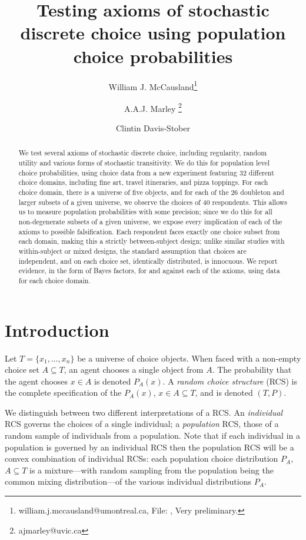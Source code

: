 \documentclass[11pt,letter]{article}
\title{Testing axioms of stochastic discrete choice using population choice probabilities}{}
\author[1]{William J. McCausland\thanks{william.j.mccausland@umontreal.ca, File: \texttt{\currfilename}, Very preliminary.}}
\author[2]{A.A.J. Marley \thanks{ajmarley@uvic.ca}}
\author[3]{Clintin Davis-Stober}
\affil[1]{Universit\'e de Montr\'eal}
\affil[2]{University of Victoria}
\affil[3]{University of Missouri}
\begin{document}
\maketitle

\begin{abstract}
	We test several axioms of stochastic discrete choice, including regularity, random utility and various forms of stochastic transitivity.
	We do this for population level choice probabilities, using choice data from a new experiment featuring 32 different choice domains, including fine art, travel itineraries, and pizza toppings.
	For each choice domain, there is a universe of five objects, and for each of the 26 doubleton and larger subsets of a given universe, we observe the choices of 40 respondents.
	This allows us to measure population probabilities with some precision; since we do this for all non-degenerate subsets of a given universe, we expose every implication of each of the axioms to possible falsification.
	Each respondent faces exactly one choice subset from each domain, making this a strictly between-subject design; unlike similar studies with within-subject or mixed designs, the standard assumption that choices are independent, and on each choice set, identically distributed, is innocuous.
	We report evidence, in the form of Bayes factors, for and against each of the axioms, using data for each choice domain.
\end{abstract}

\section{Introduction}

Let $T = \{x_1,\ldots,x_n\}$ be a universe of choice objects.
When faced with a non-empty choice set $A \subseteq T$, an agent chooses a single object from $A$.
The probability that the agent chooses $x \in A$ is denoted $P_A(x)$.
A {\em random choice structure} (RCS) is the complete specification of the $P_A(x)$, $x \in A \subseteq T$, and is denoted $(T,P)$.

We distinguish between two different interpretations of a RCS.
An {\em individual} RCS governs the choices of a single individual; a {\em population} RCS, those of a random sample of individuals from a population.
Note that if each individual in a population is governed by an individual RCS then the population RCS will be a convex combination of individual RCSs: each population choice distribution $P_A$, $A \subseteq T$ is a mixture---with random sampling from the population being the common mixing distribution---of the various individual distributions $P_A$.
\end{document}
